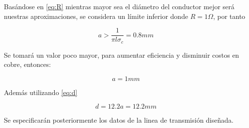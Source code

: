 Basándose en \eqref{eq:R} mientras mayor sea el diámetro del conductor mejor será nuestras aproximaciones, se considera un límite inferior donde $R=1\Omega$, por tanto

\begin{equation*}
    a>\frac{1}{\pi l \sigma_c} = 0.8mm
\end{equation*}

Se tomará un valor poco mayor, para aumentar eficiencia y disminuir costos en cobre, entonces:

$$a=1mm$$

Además utilizando \eqref{eq:d}

$$d=12.2a = 12.2mm$$

Se especificarán posteriormente los datos de la linea de transmisión diseñada.

\pagebreak
